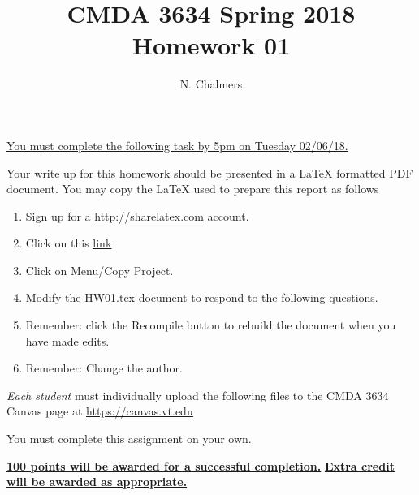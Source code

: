\documentclass{article}
\newcommand{\pad}{\vspace{8pt}\noindent}
\newcommand{\myhref}[2]{\href{#1}{\color{foo}\underline{#2}\color{black}}}
\begin{document}
\title{CMDA 3634 Spring 2018 Homework 01}

\author{N. Chalmers}
\vspace{-64pt}\maketitle
\begin{center}\underline{You must complete the following task by 5pm on Tuesday 02/06/18.}\end{center}
Your write up for this homework should be presented in a {\LaTeX} formatted PDF document. You may copy the \LaTeX{} used to prepare this report as follows

\begin{enumerate}
\item Sign up for a \myhref{http://sharelatex.com}{http://sharelatex.com} account.
\item Click on this  \myhref{https://www.sharelatex.com/read/jgjxnrcskhbc}{link} 
\item Click on Menu/Copy Project.
\item Modify the HW01.tex document to respond to the following questions. 
\item Remember: click the Recompile button to rebuild the document when you have made edits.
\item Remember: Change the author. 

\end{enumerate}

\pad \emph{Each student} must individually upload the following files to the CMDA 3634 Canvas page at \myhref{https://canvas.vt.edu}{https://canvas.vt.edu}


\pad You must complete this assignment on your own.

\vspace{16pt}
\begin{center}
\underline{\bf 100 points will be awarded for a successful completion.}
\vspace{8pt}\underline{\bf Extra credit will be awarded as appropriate.}
\end{center}
\end{document}
